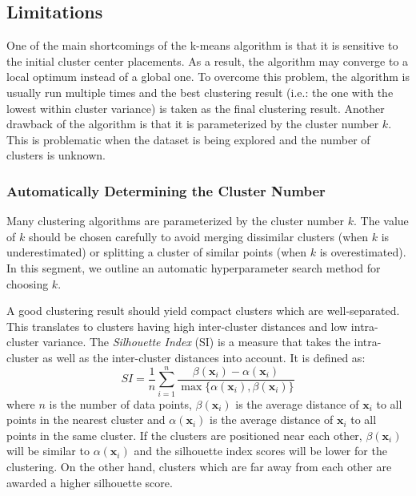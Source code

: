 \subsection{Limitations}\label{subsection:k-means_limitations}

One of the main shortcomings of the k-means algorithm is that it is sensitive to the initial cluster center placements. As a result, the algorithm may converge to a local optimum instead of a global one. To overcome this problem, the algorithm is usually run multiple times and the best clustering result (i.e.: the one with the lowest within cluster variance) is taken as the final clustering result. Another drawback of the algorithm is that it is parameterized by the cluster number $k$. This is problematic when the dataset is being explored and the number of clusters is unknown.

\subsubsection{Automatically Determining the Cluster Number}

Many clustering algorithms are parameterized by the cluster number $k$. The value of $k$ should be chosen carefully to avoid merging dissimilar clusters (when $k$ is underestimated) or splitting a cluster of similar points (when $k$ is overestimated). In this segment, we outline an automatic hyperparameter search method for choosing $k$.

A good clustering result should yield compact clusters which are well-separated. This translates to clusters having high inter-cluster distances and low intra-cluster variance. The \emph{Silhouette Index} (SI) \parencite{rousseeuw1987silhouettes} is a measure that takes the intra-cluster as well as the inter-cluster distances into account. It is defined as:
\begin{equation}
    SI = \frac{1}{n}\sum_{i=1}^{n}{\frac{\beta(\mathbf{x}_i)-\alpha(\mathbf{x}_i)}{\max\{\alpha(\mathbf{x}_i),\beta(\mathbf{x}_i)\}}}
\end{equation}
where $n$ is the number of data points, $\beta(\mathbf{x}_i)$ is the average distance of $\mathbf{x}_i$ to all points in the nearest cluster and $\alpha(\mathbf{x}_i)$ is the average distance of $\mathbf{x}_i$ to all points in the same cluster. If the clusters are positioned near each other, $\beta(\mathbf{x}_i)$ will be similar to $\alpha(\mathbf{x}_i)$ and the silhouette index scores will be lower for the clustering. On the other hand, clusters which are far away from each other are awarded a higher silhouette score.

